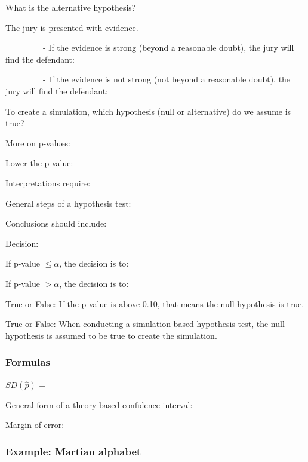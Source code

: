 \documentclass[
]{report}
\newcommand{\rgs}{\vspace{12pt}} %
\newcommand{\rgi}{\hspace{24pt}}  %
\begin{document}
\rgi What is the alternative hypothesis?
\rgs

\rgi The jury is presented with evidence.

~~~~~~~~~- If the evidence is strong (beyond a reasonable doubt), the jury will find the defendant:

\rgs

~~~~~~~~~- If the evidence is not strong (not beyond a reasonable doubt), the jury will find the defendant:

\rgs

To create a simulation, which hypothesis (null or alternative) do we assume is true?
\rgs

More on p-values:

\rgi Lower the p-value:
\rgs

\rgi Interpretations require:
\rgs

General steps of a hypothesis test:
\rgs

Conclusions should include:
\rgs

Decision:

\rgi If p-value \(\leq \alpha\), the decision is to:

\rgi If p-value \(> \alpha\), the decision is to:

True or False: If the p-value is above 0.10, that means the null hypothesis is true.

True or False: When conducting a simulation-based hypothesis test, the null hypothesis is assumed to be true to create the simulation.

\hypertarget{formulas}{%
\subsubsection*{Formulas}\label{formulas}}

\(SD(\hat{p})\) =
\rgs

General form of a theory-based confidence interval:
\rgs

Margin of error:
\rgs

\hypertarget{example-martian-alphabet}{%
\subsubsection*{Example: Martian alphabet}\label{example-martian-alphabet}}
\end{document}
